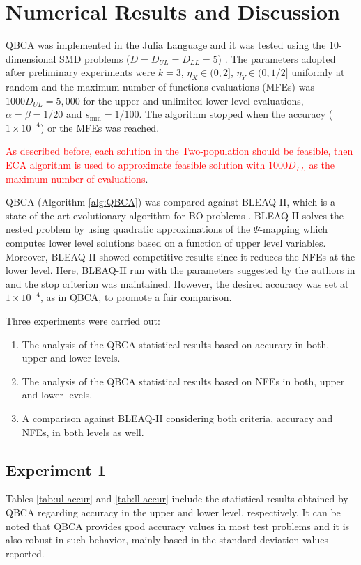 \documentclass[conference]{IEEEtran}
\theoremstyle{definition}
\begin{document}
\section{Numerical Results and Discussion} %
\label{sec:numerical_result}

QBCA was implemented in the Julia Language \cite{bezanson2017julia} and it was
tested using the 10-dimensional SMD problems ($D = D_{UL} = D_{LL} = 5$)
\cite{sinha2014test,sinha2013efficient}. The parameters adopted after preliminary
experiments were $k = 3$, $\eta_{X} \in (0, 2]$, $\eta_{Y} \in (0, 1/2]$ uniformly
at random and the maximum number of functions evaluations (MFEs) was $1000D_{UL}=5,000$
for the upper and unlimited lower level evaluations, $\alpha = \beta = 1 / 20$
and $s_{\min} = 1/100$. The  algorithm stopped when the accuracy ($1\times 10^{-4}$)
or the MFEs was reached.


\textcolor{red}{As described before, each solution in the Two-population should
be feasible, then ECA algorithm \cite{Mejia2018} is used to approximate feasible
solution with $1000D_{LL}$ as the maximum number of evaluations}.

QBCA (Algorithm \ref{alg:QBCA}) was compared against BLEAQ-II, which is a state-of-the-art
evolutionary algorithm for BO problems \cite{sinha2018review,sinha2013efficient}.
BLEAQ-II solves the nested problem by using quadratic approximations of the
$\Psi$-mapping which computes lower level solutions based on a function of upper
level variables. Moreover, BLEAQ-II showed competitive results since it reduces
the NFEs at the lower level. Here, BLEAQ-II run with the parameters suggested by
the authors in \cite{sinha2018review,sinha2017bilevel} and the stop criterion was
maintained.  However, the desired accuracy was set at $1\times 10^{-4}$, as in
QBCA, to promote a fair comparison.

Three experiments were carried out:
% 
\begin{enumerate}
    \item The analysis of the QBCA statistical results based on accurary in both,
          upper and lower levels.
    \item The analysis of the QBCA statistical results based on NFEs in both,
          upper and lower levels. 
    \item A comparison against BLEAQ-II considering both criteria, accuracy and
          NFEs, in both levels as well.
\end{enumerate}
% 

\subsection{Experiment 1}
Tables \ref{tab:ul-accur} and \ref{tab:ll-accur} include the statistical results
obtained by QBCA regarding accuracy in the upper and lower level, respectively.
It can be noted that QBCA provides good accuracy values in most test problems
and it is also robust in such behavior, mainly based in the standard deviation
values reported. 
\end{document}
